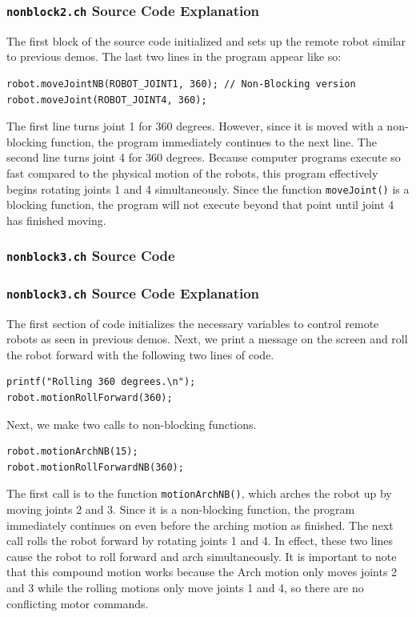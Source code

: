 \documentclass{article}
\begin{document}
\subsubsection{\texttt{nonblock2.ch} Source Code Explanation}
The first block of the source code initialized and sets up the remote robot 
similar to previous demos. The last two lines in the program appear like so:
\begin{verbatim}
robot.moveJointNB(ROBOT_JOINT1, 360); // Non-Blocking version
robot.moveJoint(ROBOT_JOINT4, 360);
\end{verbatim}
The first line turns joint 1 for 360 degrees. However, since it is moved with a non-blocking function,
the program immediately continues to the next line. The second line turns joint 4 for
360 degrees. Because computer programs execute so fast compared to the physical
motion of the robots, this program effectively begins rotating joints 1 and 4 
simultaneously. Since the function \texttt{moveJoint()} is a blocking function,
the program will not execute beyond that point until joint 4 has finished moving.

\subsubsection{\texttt{nonblock3.ch} Source Code}

\subsubsection{\texttt{nonblock3.ch} Source Code Explanation}
The first section of code initializes the necessary variables to control remote
robots as seen in previous demos. Next, we print a message on the screen and 
roll the robot forward with the following two lines of code.
\begin{verbatim}
printf("Rolling 360 degrees.\n");
robot.motionRollForward(360);
\end{verbatim}
Next, we make two calls to non-blocking functions.
\begin{verbatim}
robot.motionArchNB(15);
robot.motionRollForwardNB(360);
\end{verbatim}
The first call is to the function \texttt{motionArchNB()}, which arches the robot
up by moving joints 2 and 3. Since it is a non-blocking function, the program
immediately continues on even before the arching motion as finished. The
next call rolls the robot forward by rotating joints 1 and 4. In effect, these
two lines cause the robot to roll forward and arch simultaneously. It is important
to note that this compound motion works because the Arch motion only moves 
joints 2 and 3 while the rolling motions only move joints 1 and 4, so there are
no conflicting motor commands.
\end{document}
